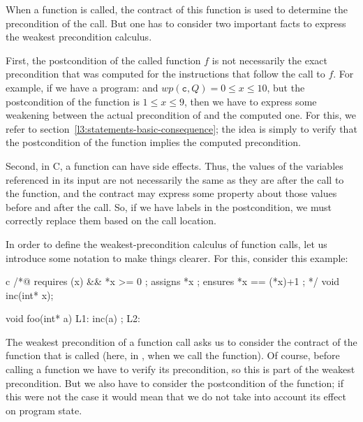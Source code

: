

When a function is called, the contract of this function is used to determine
the precondition of the call. But one has to consider two important facts to
express the weakest precondition calculus.



First, the postcondition of the called function $f$ is not necessarily
the exact precondition that was computed for the instructions that follow
the call to $f$. For example, if we have a program: 
and $wp(\texttt{c}, Q) = 0 \leq x \leq 10$, but the postcondition of the
function  is $1 \leq x \leq 9$, then we have to express some
weakening between the actual precondition of  and the computed
one. For this, we refer to section~\ref{l3:statements-basic-consequence};
the idea is simply to verify that the postcondition of the function implies
the computed precondition.



Second, in C, a function can have side effects. Thus, the values of the
variables referenced in its input are not necessarily the same as they are after the
call to the function, and the contract may express some property about those
values before and after the call. So, if we have labels in the postcondition,
we must correctly replace them based on the call location.



In order to define the weakest-precondition calculus of function calls, let
us introduce some notation to make things clearer. For this, consider this
example:


\begin{CodeBlock}{c}
/*@ requires \valid(x) && *x >= 0 ;
    assigns *x ;
    ensures *x == \old(*x)+1 ; */
void inc(int* x);

void foo(int* a){
  L1:
  inc(a) ;
  L2:
}
\end{CodeBlock}




The weakest precondition of a function call asks us to consider the contract
of the function that is called (here, in , when we call the
 function). Of course, before calling a function we have
to verify its precondition, so this is part of the weakest precondition. But we
also have to consider the postcondition of the function; if this were
not the case it would mean
that we do not take into account its effect on program state.




